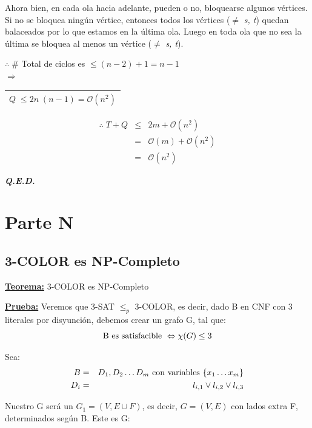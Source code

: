 \documentclass[12pt,a4paper]{report}
\newcounter{neq}
\newcommand{\QED}{\hfill \textit{\textbf{Q.E.D.}}}
\begin{document}
  				\par Ahora bien, en cada ola hacia adelante, pueden o no, bloquearse algunos vértices. Si no se bloquea ningún vértice, entonces todos los vértices ($\neq$ \textit{s, t}) quedan balaceados por lo que estamos en la última ola. Luego en toda ola que no sea la última se bloquea al menos un vértice ($\neq$ \textit{s, t}).
  				\begin{center}
  					$\therefore \; \#$ Total de ciclos es $\leq (n - 2) + 1 = n - 1$ \\
  					\vspace{3mm}
  					$\Rightarrow$ \begin{tabular}{|c|} \hline $Q \; \leq 2 n \; (n - 1) = \mathcal{O}(n^{2})$ \\ \hline \end{tabular}
  				\end{center}

  				\begin{eqnarray}
  					\nonumber \therefore \; T + Q &\leq & 2 m + \mathcal{O}(n^{2}) \\
  					\nonumber &=& \mathcal{O}(m) + \mathcal{O}(n^{2}) \\
  					\nonumber &=& \mathcal{O}(n^{2})
  				\end{eqnarray}

  		\QED


  \chapter{Parte N}

  	\section{3-COLOR es NP-Completo}
  		\textbf{\underline{Teorema:}} 3-COLOR es NP-Completo

  		\textbf{\underline{Prueba:}} Veremos que 3-SAT $\leq_{p}$ 3-COLOR, es decir, dado B en CNF con 3 literales por disyunción, debemos crear un grafo G, tal que:
  			\[ \textup{B es satisfacible } \Leftrightarrow \chi(G) \leq 3 \]
  			\par Sea:
  				\begin{eqnarray}
  					\nonumber B &=& D_{1}, D_{2} \dotsc D_{m} \textup{ con variables } \lbrace x_{1} \dotsc x_{m} \rbrace \\
  					\nonumber D_{i} &=& l_{i, 1} \vee l_{i, 2} \vee l_{i, 3}
  				\end{eqnarray}

  			\par Nuestro G será un $G_{1} = (V, E \cup F)$, es decir, $G = (V, E)$ con lados extra F, determinados según B. Este es G:
\end{document}
